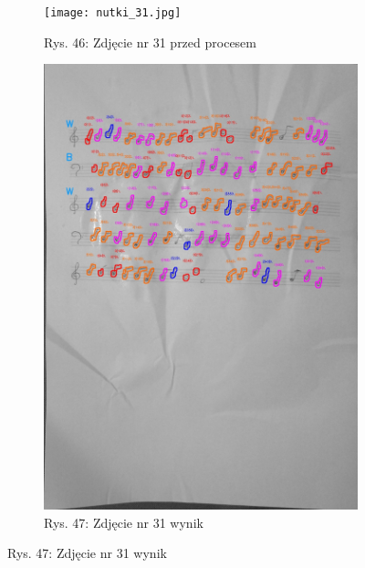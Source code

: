\documentclass[11pt]{article}
\begin{document}
\begin{figure}
\begin{subfigure}[b]{0.475\textwidth}
        \centering
        \graphicspath{ {Resources/} }
        \texttt{[image: nutki\_31.jpg]}
        \caption[]%
        {{\small Rys. 46: Zdjęcie nr 31 przed procesem}}
        \label{fig:sub3}
    \end{subfigure}
    \quad
    \begin{subfigure}[b]{0.475\textwidth}
        \centering
        \graphicspath{ {blobs/} }
        \includegraphics[width=\textwidth]{31_cnts.jpg}
        \caption[]%
        {{\small Rys. 47: Zdjęcie nr 31 wynik}}
        \label{fig:sub 4}
    \end{subfigure}
    \label{fig 6}
\end{figure}

\FloatBarrier
\end{document}
